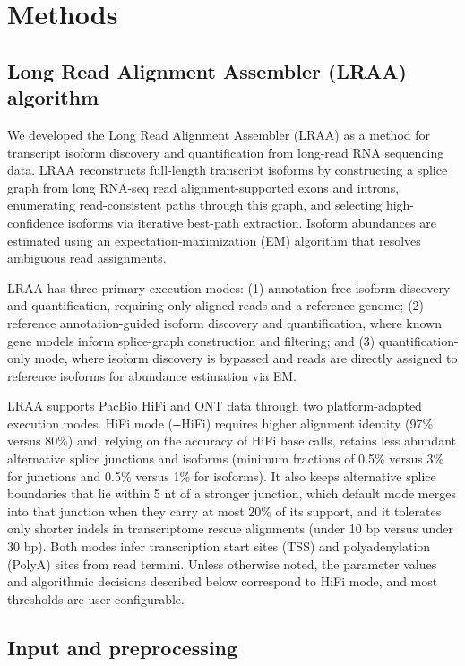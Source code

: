 \section{Methods}\label{methods}

\subsection{Long Read Alignment Assembler (LRAA) algorithm}\label{longreadalignmentassembler-lraa-algorithm}

We developed the Long Read Alignment Assembler (LRAA) as a method for transcript isoform discovery and quantification from long-read RNA sequencing data. LRAA reconstructs full-length transcript isoforms by constructing a splice graph from long RNA-seq read alignment-supported exons and introns, enumerating read-consistent paths through this graph, and selecting high-confidence isoforms via iterative best-path extraction. Isoform abundances are estimated using an expectation-maximization (EM) algorithm that resolves ambiguous read assignments.

LRAA has three primary execution modes: (1) annotation-free isoform discovery and quantification, requiring only aligned reads and a reference genome; (2) reference annotation-guided isoform discovery and quantification, where known gene models inform splice-graph construction and filtering; and (3) quantification-only mode, where isoform discovery is bypassed and reads are directly assigned to reference isoforms for abundance estimation via EM.

LRAA supports PacBio HiFi and ONT data through two platform-adapted execution modes. HiFi mode (-\/-HiFi) requires higher alignment identity (97\% versus 80\%) and, relying on the accuracy of HiFi base calls, retains less abundant alternative splice junctions and isoforms (minimum fractions of 0.5\% versus 3\% for junctions and 0.5\% versus 1\% for isoforms). It also keeps alternative splice boundaries that lie within 5 nt of a stronger junction, which default mode merges into that junction when they carry at most 20\% of its support, and it tolerates only shorter indels in transcriptome rescue alignments (under 10 bp versus under 30 bp). Both modes infer transcription start sites (TSS) and polyadenylation (PolyA) sites from read termini. Unless otherwise noted, the parameter values and algorithmic decisions described below correspond to HiFi mode, and most thresholds are user-configurable.

\subsection{Input and preprocessing}\label{input-and-preprocessing}

